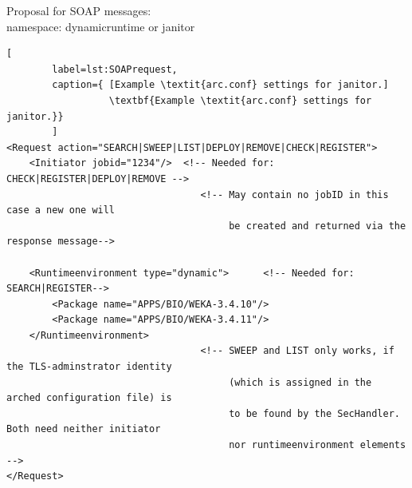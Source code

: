 Proposal for SOAP messages:\\
 namespace: dynamicruntime or janitor\\
\begin{lstlisting}[
        label=lst:SOAPrequest,
        caption={ [Example \textit{arc.conf} settings for janitor.]
                  \textbf{Example \textit{arc.conf} settings for janitor.}}
        ]
<Request action="SEARCH|SWEEP|LIST|DEPLOY|REMOVE|CHECK|REGISTER">
	<Initiator jobid="1234"/>  <!-- Needed for: CHECK|REGISTER|DEPLOY|REMOVE -->
                                  <!-- May contain no jobID in this case a new one will 
                                       be created and returned via the response message-->

	<Runtimeenvironment type="dynamic">      <!-- Needed for: SEARCH|REGISTER-->
		<Package name="APPS/BIO/WEKA-3.4.10"/>
		<Package name="APPS/BIO/WEKA-3.4.11"/>
	</Runtimeenvironment>
                                  <!-- SWEEP and LIST only works, if the TLS-adminstrator identity 
                                       (which is assigned in the arched configuration file) is
                                       to be found by the SecHandler. Both need neither initiator 
                                       nor runtimeenvironment elements -->
</Request>
\end{lstlisting}

